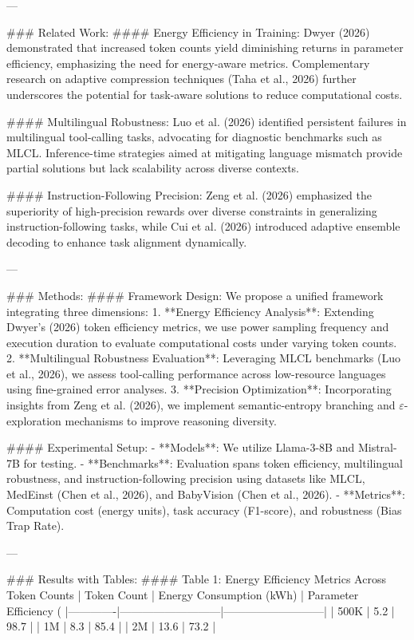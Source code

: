 ---

### Related Work:  
#### Energy Efficiency in Training:  
Dwyer (2026) demonstrated that increased token counts yield diminishing returns in parameter efficiency, emphasizing the need for energy-aware metrics. Complementary research on adaptive compression techniques (Taha et al., 2026) further underscores the potential for task-aware solutions to reduce computational costs.

#### Multilingual Robustness:  
Luo et al. (2026) identified persistent failures in multilingual tool-calling tasks, advocating for diagnostic benchmarks such as MLCL. Inference-time strategies aimed at mitigating language mismatch provide partial solutions but lack scalability across diverse contexts.

#### Instruction-Following Precision:  
Zeng et al. (2026) emphasized the superiority of high-precision rewards over diverse constraints in generalizing instruction-following tasks, while Cui et al. (2026) introduced adaptive ensemble decoding to enhance task alignment dynamically.

---

### Methods:  
#### Framework Design:  
We propose a unified framework integrating three dimensions:  
1. **Energy Efficiency Analysis**: Extending Dwyer's (2026) token efficiency metrics, we use power sampling frequency and execution duration to evaluate computational costs under varying token counts.  
2. **Multilingual Robustness Evaluation**: Leveraging MLCL benchmarks (Luo et al., 2026), we assess tool-calling performance across low-resource languages using fine-grained error analyses.  
3. **Precision Optimization**: Incorporating insights from Zeng et al. (2026), we implement semantic-entropy branching and $\varepsilon$-exploration mechanisms to improve reasoning diversity.

#### Experimental Setup:  
- **Models**: We utilize Llama-3-8B and Mistral-7B for testing.  
- **Benchmarks**: Evaluation spans token efficiency, multilingual robustness, and instruction-following precision using datasets like MLCL, MedEinst (Chen et al., 2026), and BabyVision (Chen et al., 2026).  
- **Metrics**: Computation cost (energy units), task accuracy (F1-score), and robustness (Bias Trap Rate).

---

### Results with Tables:  
#### Table 1: Energy Efficiency Metrics Across Token Counts  
| Token Count | Energy Consumption (kWh) | Parameter Efficiency (%
|-------------|---------------------------|---------------------------|  
| 500K        | 5.2                       | 98.7                      |  
| 1M          | 8.3                       | 85.4                      |  
| 2M          | 13.6                      | 73.2                      |  

